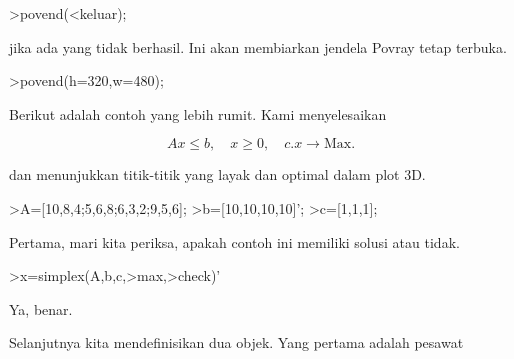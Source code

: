 \documentclass[a4paper,10pt]{article}
\begin{document}
\begin{eulernotebook}
\begin{eulercomment}
\begin{eulercomment}
\begin{eulercomment}
\begin{eulercomment}
\begin{eulercomment}
\begin{eulercomment}
\begin{eulercomment}
\begin{eulercomment}
\begin{eulercomment}
\begin{eulercomment}
\begin{eulercomment}
\begin{eulercomment}
\begin{eulercomment}
\begin{eulercomment}
\begin{eulercomment}
\begin{eulercomment}
\begin{eulercomment}
\end{eulercomment}
\begin{eulerttcomment}
 >povend(<keluar);
\end{eulerttcomment}
\begin{eulercomment}

jika ada yang tidak berhasil. Ini akan membiarkan jendela Povray tetap
terbuka.
\end{eulercomment}
\begin{eulerprompt}
>povend(h=320,w=480);
\end{eulerprompt}
\begin{eulercomment}
Berikut adalah contoh yang lebih rumit. Kami menyelesaikan

\end{eulercomment}
\begin{eulerformula}
\[
Ax \le b, \quad x \ge 0, \quad c.x \to \text{Max.}
\]
\end{eulerformula}
\begin{eulercomment}
dan menunjukkan titik-titik yang layak dan optimal dalam plot 3D.
\end{eulercomment}
\begin{eulerprompt}
>A=[10,8,4;5,6,8;6,3,2;9,5,6];
>b=[10,10,10,10]';
>c=[1,1,1];
\end{eulerprompt}
\begin{eulercomment}
Pertama, mari kita periksa, apakah contoh ini memiliki solusi atau
tidak.
\end{eulercomment}
\begin{eulerprompt}
>x=simplex(A,b,c,>max,>check)'
\end{eulerprompt}
\begin{euleroutput}
  [0,  1,  0.5]
\end{euleroutput}
\begin{eulercomment}
Ya, benar.

Selanjutnya kita mendefinisikan dua objek. Yang pertama adalah pesawat


\end{eulercomment}
\end{eulercomment}
\end{eulercomment}
\end{eulercomment}
\end{eulercomment}
\end{eulercomment}
\end{eulercomment}
\end{eulercomment}
\end{eulercomment}
\end{eulercomment}
\end{eulercomment}
\end{eulercomment}
\end{eulercomment}
\end{eulercomment}
\end{eulercomment}
\end{eulercomment}
\end{eulercomment}
\end{eulernotebook}
\end{document}
